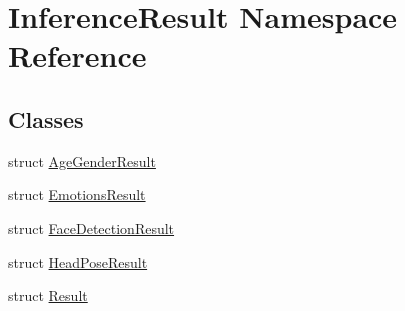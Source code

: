 \hypertarget{namespaceInferenceResult}{}\section{Inference\+Result Namespace Reference}
\label{namespaceInferenceResult}
\subsection*{Classes}
\begin{DoxyCompactItemize}
\item 
struct \hyperlink{structInferenceResult_1_1AgeGenderResult}{Age\+Gender\+Result}
\item 
struct \hyperlink{structInferenceResult_1_1EmotionsResult}{Emotions\+Result}
\item 
struct \hyperlink{structInferenceResult_1_1FaceDetectionResult}{Face\+Detection\+Result}
\item 
struct \hyperlink{structInferenceResult_1_1HeadPoseResult}{Head\+Pose\+Result}
\item 
struct \hyperlink{structInferenceResult_1_1Result}{Result}
\end{DoxyCompactItemize}
